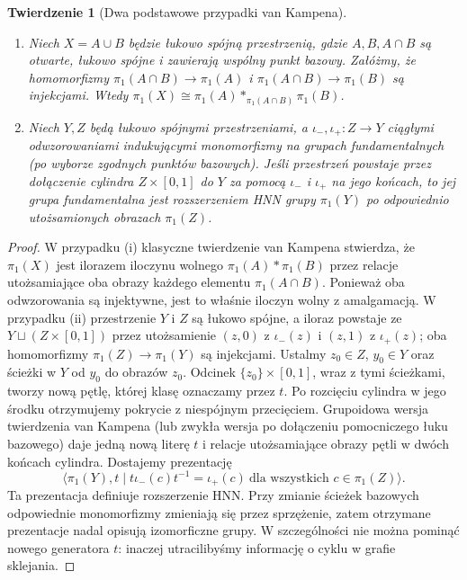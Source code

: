 \documentclass[11pt,a4paper]{report}
\numberwithin{equation}{section}
\theoremstyle{plain}
\newtheorem{twierdzenie}{Twierdzenie}[section]
\theoremstyle{definition}
\theoremstyle{remark}
\begin{document}
\begin{twierdzenie}[Dwa podstawowe przypadki van Kampena]
\label{thm:tg-vk-amalgam-hnn}
\begin{enumerate}[label=(\roman*)]
\item Niech $X=A\cup B$ będzie łukowo spójną
przestrzenią, gdzie $A,B,A\cap B$ są otwarte,
łukowo spójne i zawierają wspólny punkt bazowy.
Załóżmy, że homomorfizmy
$\pi_1(A\cap B)\to\pi_1(A)$ i
$\pi_1(A\cap B)\to\pi_1(B)$ są injekcjami.
Wtedy
$\pi_1(X)\cong\pi_1(A)*_{\pi_1(A\cap B)}\pi_1(B)$.
\item Niech $Y,Z$ będą łukowo spójnymi przestrzeniami,
a $\iota_-,\iota_+\colon Z\to Y$ ciągłymi odwzorowaniami
indukującymi monomorfizmy na grupach fundamentalnych
(po wyborze zgodnych punktów bazowych). Jeśli przestrzeń
powstaje przez dołączenie cylindra $Z\times[0,1]$ do $Y$
za pomocą $\iota_-$ i $\iota_+$ na jego końcach,
to jej grupa fundamentalna jest
rozszerzeniem HNN grupy $\pi_1(Y)$ po odpowiednio
utożsamionych obrazach $\pi_1(Z)$.
\end{enumerate}
\end{twierdzenie}
\begin{proof}
W przypadku (i) klasyczne twierdzenie van Kampena stwierdza, że
$\pi_1(X)$ jest ilorazem iloczynu wolnego
$\pi_1(A)*\pi_1(B)$ przez relacje utożsamiające
oba obrazy każdego elementu $\pi_1(A\cap B)$.
Ponieważ oba odwzorowania są injektywne, jest to
właśnie iloczyn wolny z amalgamacją. W przypadku (ii) przestrzenie $Y$ i $Z$ są łukowo spójne,
a iloraz powstaje ze $Y\sqcup(Z\times[0,1])$ przez
utożsamienie $(z,0)$ z $\iota_-(z)$ i $(z,1)$ z
$\iota_+(z)$; oba homomorfizmy $\pi_1(Z)\to\pi_1(Y)$
są injekcjami. Ustalmy $z_0\in Z$, $y_0\in Y$
oraz ścieżki w $Y$ od $y_0$ do obrazów $z_0$.
Odcinek $\{z_0\}\times[0,1]$, wraz z tymi ścieżkami,
tworzy nową pętlę, której klasę oznaczamy przez $t$.
Po rozcięciu cylindra w jego środku otrzymujemy pokrycie
z niespójnym przecięciem. Grupoidowa wersja twierdzenia
van Kampena (lub zwykła wersja po dołączeniu pomocniczego
łuku bazowego) daje jedną nową literę $t$ i relacje
utożsamiające obrazy pętli w dwóch końcach cylindra.
Dostajemy prezentację
\[
\langle \pi_1(Y),t\mid t\iota_-(c)t^{-1}=\iota_+(c)
\ \text{dla wszystkich }c\in\pi_1(Z)\rangle.
\]
Ta prezentacja definiuje rozszerzenie HNN. Przy zmianie ścieżek bazowych odpowiednie monomorfizmy
zmieniają się przez sprzężenie, zatem otrzymane prezentacje
nadal opisują izomorficzne grupy. W szczególności nie można
pominąć nowego generatora $t$: inaczej utracilibyśmy
informację o cyklu w grafie sklejania.
\end{proof}
\end{document}
